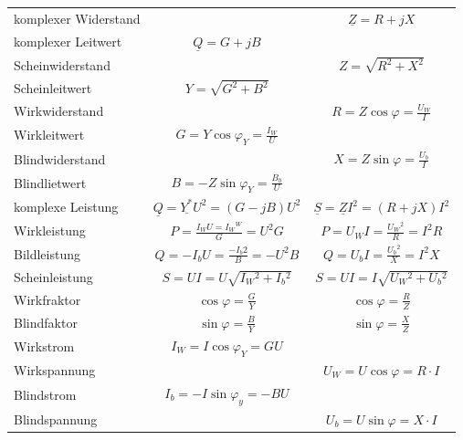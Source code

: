 \begin{centering}
\begin{tabular}{|l|c|c|}
		\hline
			komplexer Widerstand & & $\underline{Z}=R+jX$\\
			komplexer Leitwert & $\underline{Q}=G+jB$ &\\
		\hline
			Scheinwiderstand & & $Z=\sqrt{R^2+X^2}$\\
			Scheinleitwert & $Y=\sqrt{G^2+B^2}$ & \\
		\hline
			Wirkwiderstand & & $R=Z\cos\varphi=\frac{U_W}{I}$\\
			Wirkleitwert & $G=Y\cos\varphi_Y=\frac{I_W}{U}$&\\
		\hline
			Blindwiderstand & & $X=Z\sin\varphi=\frac{U_b}{I}$\\
			Blindlietwert & $B = -Z\sin\varphi_Y = \frac{B_b}{U}$&\\
		\hline
			komplexe Leistung & $\underline{Q}=
			\underline{Y^*}U^2=\left(G-jB\right)U^2$& $\underline{S}=\underline{Z}I^2=\left(R+jX\right)I^2$\\
			Wirkleistung & $P=\frac{I_WU=I{_W}{^W}}{G}=U^2G$ &
			$P=U_WI=\frac{U{_W}{^2}}{R}=I^2R$ \\
			Bildleistung & $Q=-I_bU=\frac{-I{_b}{2}}{B}=-U^2B$ & $Q = U_bI =
			\frac{U{_b}{^2}}{X}=I^2X$\\
			Scheinleistung & $S=UI=U\sqrt{I{_W}{^2}+I{_b}{^2}}$ & $S=UI =
			I\sqrt{U{_W}{^2}+U{_b}{^2}}$\\
		\hline
			Wirkfraktor & $\cos\varphi= \frac{G}{Y}$ & $\cos\varphi=\frac{R}{Z}$\\
			Blindfaktor & $\sin\varphi= \frac{B}{Y}$ & $\sin\varphi=\frac{X}{Z}$\\
		\hline
			Wirkstrom & $I_W=I\cos\varphi_Y=GU$ & \\
			Wirkspannung & & $U_W = U\cos\varphi =R \cdot I$ \\
		\hline
			Blindstrom & $I_b = -I \sin\varphi_y = -BU$ & \\
			Blindspannung & & $U_b=U\sin\varphi=X\cdot I$\\
		\hline
	\end{tabular}\\
	\end{centering}
